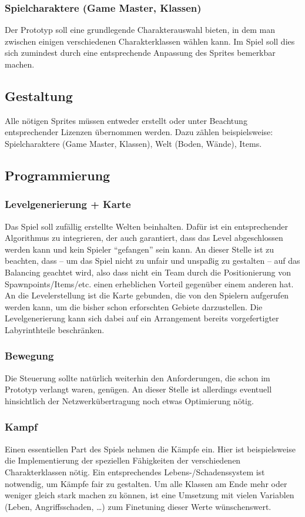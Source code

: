 \documentclass[10pt,a4paper,notitlepage]{report}
\begin{document}
\begin{flushleft}
\subsubsection{Spielcharaktere (Game Master, Klassen)}
Der Prototyp soll eine grundlegende Charakterauswahl bieten, in dem man zwischen einigen verschiedenen Charakterklassen wählen kann. Im Spiel soll dies sich zumindest durch eine entsprechende Anpassung des Sprites bemerkbar machen.

\subsection{Gestaltung}
Alle nötigen Sprites müssen entweder erstellt oder unter Beachtung entsprechender Lizenzen übernommen werden. Dazu zählen beispielsweise: Spielcharaktere (Game Master, Klassen), Welt (Boden, Wände), Items.

\subsection{Programmierung}

\subsubsection{Levelgenerierung + Karte}
Das Spiel soll zufällig erstellte Welten beinhalten. Dafür ist ein entsprechender Algorithmus zu integrieren, der auch garantiert, dass das Level abgeschlossen werden kann und kein Spieler \enquote{gefangen} sein kann. An dieser Stelle ist zu beachten, dass – um das Spiel nicht zu unfair und unspaßig zu gestalten – auf das Balancing geachtet wird, also dass nicht ein Team durch die Positionierung von Spawnpoints/Items/etc. einen erheblichen Vorteil gegenüber einem anderen hat. An die Levelerstellung ist die Karte gebunden, die von den Spielern aufgerufen werden kann, um die bisher schon erforschten Gebiete darzustellen. Die Levelgenerierung kann sich dabei auf ein Arrangement bereits vorgefertigter Labyrinthteile beschränken.

\subsubsection{Bewegung}
Die Steuerung sollte natürlich weiterhin den Anforderungen, die schon im Prototyp verlangt waren, genügen. An dieser Stelle ist allerdings eventuell hinsichtlich der Netzwerkübertragung noch etwas Optimierung nötig. 

\subsubsection{Kampf} 
Einen essentiellen Part des Spiels nehmen die Kämpfe ein. Hier ist beispielsweise die Implementierung der speziellen Fähigkeiten der verschiedenen Charakterklassen nötig. Ein entsprechendes Lebens-/Schadenssystem ist notwendig, um Kämpfe fair zu gestalten. Um alle Klassen am Ende mehr oder weniger gleich stark machen zu können, ist eine Umsetzung mit vielen Variablen (Leben, Angriffsschaden, …) zum Finetuning dieser Werte wünschenswert. 


\end{flushleft}
\end{document}
